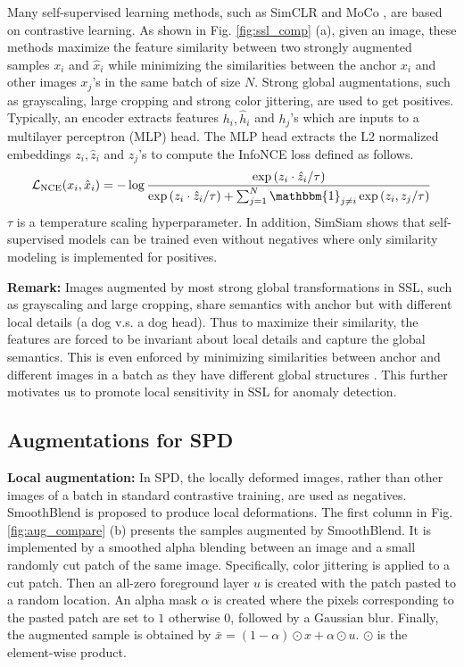 Many self-supervised learning methods, such as SimCLR \cite{chen2020simple} and MoCo \cite{he2020momentum}, are based on contrastive learning. As shown in Fig. \ref{fig:ssl_comp} (a), given an image, these methods maximize the feature similarity between two strongly augmented samples $x_i$ and $\hat{x}_i$ while minimizing the similarities between the anchor $x_i$ and other images $x_j$'s in the same batch of size $N$. Strong global augmentations, such as grayscaling, large cropping and strong color jittering, are used to get positives. Typically, an encoder extracts features $h_i,\hat{h}_i$ and $h_j$'s which are inputs to a multilayer perceptron (MLP) head. The MLP head extracts the L2 normalized embeddings $z_i,\hat{z}_i$ and $z_j$'s to compute the InfoNCE loss defined as follows.
\begin{equation}
    \mathcal{L}_{\mathrm{NCE}}(x_i,\hat{x}_i)= -\log\frac{\exp{(z_i\cdot \hat{z}_i/\tau)}}{\exp{(z_i\cdot \hat{z}_i/\tau)}+\sum_{j=1}^{N}\mathbbm{1}_{j\neq i}\exp{(z_i,z_j}/\tau)}
    \label{eqn:loss_nce}
\end{equation}
$\tau$ is a temperature scaling hyperparameter. In addition, SimSiam \cite{chen2021exploring} shows that self-supervised models can be trained even without negatives where only similarity modeling is implemented for positives.

\noindent\textbf{Remark:} Images augmented by most strong global transformations in SSL, such as grayscaling and large cropping, share semantics with anchor but with different local details (a dog v.s. a dog head). Thus to maximize their similarity, the features are forced to be invariant about local details and capture the global semantics. This is even enforced by minimizing similarities between anchor and different images in a batch as they have different global structures \cite{chen2020simple,ericsson2021self}. This further motivates us to promote local sensitivity in SSL for anomaly detection.
\subsection{Augmentations for SPD}
\noindent\textbf{Local augmentation:} In SPD, the locally deformed images, rather than other images of a batch in standard contrastive training, are used as negatives. SmoothBlend is proposed to produce local deformations. The first column in Fig. \ref{fig:aug_compare} (b) presents the samples augmented by SmoothBlend. It is implemented by a smoothed alpha blending between an image and a small randomly cut patch of the same image. Specifically, color jittering is applied to a cut patch. Then an all-zero foreground layer $u$ is created with the patch pasted to a random location. An alpha mask $\alpha$ is created where the pixels corresponding to the pasted patch are set to $1$ otherwise $0$, followed by a Gaussian blur. Finally, the augmented sample is obtained by $\bar{x} = (1-\alpha) \odot x + \alpha \odot u$. $\odot$ is the element-wise product. 

